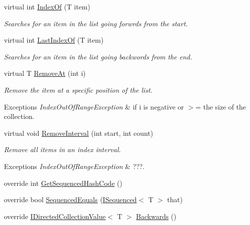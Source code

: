 \begin{DoxyCompactItemize}
virtual int \hyperlink{class_c5_1_1_hashed_linked_list_aca8634364d0bfec4b0d2bb8b7c6f5c98}{Index\+Of} (T item)
\begin{DoxyCompactList}\small\item\em Searches for an item in the list going forwrds from the start. \end{DoxyCompactList}\item 
virtual int \hyperlink{class_c5_1_1_hashed_linked_list_a4e053c03fa87e356bab7ec25a529607a}{Last\+Index\+Of} (T item)
\begin{DoxyCompactList}\small\item\em Searches for an item in the list going backwords from the end. \end{DoxyCompactList}\item 
virtual T \hyperlink{class_c5_1_1_hashed_linked_list_ae29691247778dcae44ae4a4482c4c94f}{Remove\+At} (int i)
\begin{DoxyCompactList}\small\item\em Remove the item at a specific position of the list. 
\begin{DoxyExceptions}{Exceptions}
{\em Index\+Out\+Of\+Range\+Exception} & if i is negative or $>$= the size of the collection. \\
\hline
\end{DoxyExceptions}
\end{DoxyCompactList}\item 
virtual void \hyperlink{class_c5_1_1_hashed_linked_list_ab2b43feeeb2c5cece0d5e65949c178b3}{Remove\+Interval} (int start, int count)
\begin{DoxyCompactList}\small\item\em Remove all items in an index interval. 
\begin{DoxyExceptions}{Exceptions}
{\em Index\+Out\+Of\+Range\+Exception} & ???. \\
\hline
\end{DoxyExceptions}
\end{DoxyCompactList}\item 
override int \hyperlink{class_c5_1_1_hashed_linked_list_ab1ef52935e3a9a7ba78b1ddecc7a696e}{Get\+Sequenced\+Hash\+Code} ()
\item 
override bool \hyperlink{class_c5_1_1_hashed_linked_list_a473d18abd8b89ee61184fd6731e76029}{Sequenced\+Equals} (\hyperlink{interface_c5_1_1_i_sequenced}{I\+Sequenced}$<$ T $>$ that)
\item 
override \hyperlink{interface_c5_1_1_i_directed_collection_value}{I\+Directed\+Collection\+Value}$<$ T $>$ \hyperlink{class_c5_1_1_hashed_linked_list_ad0fbbf15338c5aae4278a5e44f8d9c69}{Backwards} ()

\end{DoxyCompactItemize}
